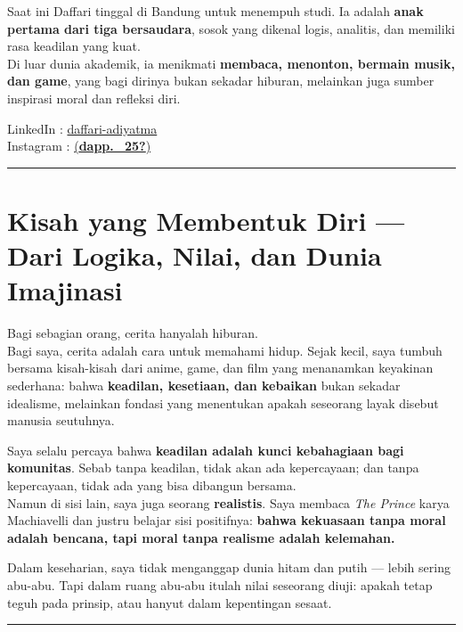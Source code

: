 \documentclass[
  letterpaper,
  DIV=11,
  numbers=noendperiod]{scrreprt}
\begin{document}
Saat ini Daffari tinggal di Bandung untuk menempuh studi. Ia adalah
\textbf{anak pertama dari tiga bersaudara}, sosok yang dikenal logis,
analitis, dan memiliki rasa keadilan yang kuat.\\
Di luar dunia akademik, ia menikmati \textbf{membaca, menonton, bermain
musik, dan game}, yang bagi dirinya bukan sekadar hiburan, melainkan
juga sumber inspirasi moral dan refleksi diri.

LinkedIn :
\href{https://www.linkedin.com/in/daffari-adiyatma-092874255/}{daffari-adiyatma}\\
Instagram :
\href{https://www.instagram.com/dapp._25/?next=\%2F}{(\textbf{dapp.\_25?})}

\begin{center}\rule{0.5\linewidth}{0.5pt}\end{center}

\section{\texorpdfstring{\textbf{Kisah yang Membentuk Diri --- Dari
Logika, Nilai, dan Dunia
Imajinasi}}{Kisah yang Membentuk Diri --- Dari Logika, Nilai, dan Dunia Imajinasi}}\label{kisah-yang-membentuk-diri-dari-logika-nilai-dan-dunia-imajinasi}

Bagi sebagian orang, cerita hanyalah hiburan.\\
Bagi saya, cerita adalah cara untuk memahami hidup. Sejak kecil, saya
tumbuh bersama kisah-kisah dari anime, game, dan film yang menanamkan
keyakinan sederhana: bahwa \textbf{keadilan, kesetiaan, dan kebaikan}
bukan sekadar idealisme, melainkan fondasi yang menentukan apakah
seseorang layak disebut manusia seutuhnya.

Saya selalu percaya bahwa \textbf{keadilan adalah kunci kebahagiaan bagi
komunitas}. Sebab tanpa keadilan, tidak akan ada kepercayaan; dan tanpa
kepercayaan, tidak ada yang bisa dibangun bersama.\\
Namun di sisi lain, saya juga seorang \textbf{realistis}. Saya membaca
\emph{The Prince} karya Machiavelli dan justru belajar sisi positifnya:
\textbf{bahwa kekuasaan tanpa moral adalah bencana, tapi moral tanpa
realisme adalah kelemahan.}

Dalam keseharian, saya tidak menganggap dunia hitam dan putih --- lebih
sering abu-abu. Tapi dalam ruang abu-abu itulah nilai seseorang diuji:
apakah tetap teguh pada prinsip, atau hanyut dalam kepentingan sesaat.

\begin{center}\rule{0.5\linewidth}{0.5pt}\end{center}
\end{document}
